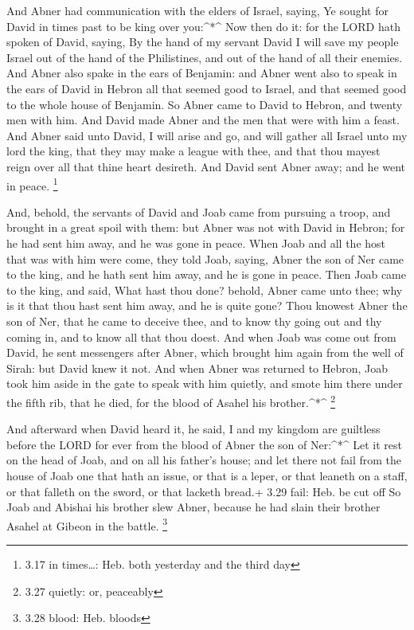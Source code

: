  And Abner had communication with the elders of Israel,
saying, Ye sought for David in times past to be king over you:\^{}*\^{}
 Now then do it: for the LORD hath spoken of David, saying,
By the hand of my servant David I will save my people Israel out of the
hand of the Philistines, and out of the hand of all their enemies.
 And Abner also spake in the ears of Benjamin: and Abner
went also to speak in the ears of David in Hebron all that seemed good
to Israel, and that seemed good to the whole house of Benjamin.
 So Abner came to David to Hebron, and twenty men with him.
And David made Abner and the men that were with him a feast.
 And Abner said unto David, I will arise and go, and will
gather all Israel unto my lord the king, that they may make a league
with thee, and that thou mayest reign over all that thine heart
desireth. And David sent Abner away; and he went in peace. \footnote{3.17
  in times\ldots: Heb. both yesterday and the third day}

 And, behold, the servants of David and Joab came from
pursuing a troop, and brought in a great spoil with them: but Abner was
not with David in Hebron; for he had sent him away, and he was gone in
peace.  When Joab and all the host that was with him were
come, they told Joab, saying, Abner the son of Ner came to the king, and
he hath sent him away, and he is gone in peace.  Then Joab
came to the king, and said, What hast thou done? behold, Abner came unto
thee; why is it that thou hast sent him away, and he is quite gone?
 Thou knowest Abner the son of Ner, that he came to deceive
thee, and to know thy going out and thy coming in, and to know all that
thou doest.  And when Joab was come out from David, he sent
messengers after Abner, which brought him again from the well of Sirah:
but David knew it not.  And when Abner was returned to
Hebron, Joab took him aside in the gate to speak with him quietly, and
smote him there under the fifth rib, that he died, for the blood of
Asahel his brother.\^{}*\^{} \footnote{3.27 quietly: or, peaceably}

 And afterward when David heard it, he said, I and my
kingdom are guiltless before the LORD for ever from the blood of Abner
the son of Ner:\^{}*\^{}  Let it rest on the head of Joab,
and on all his father's house; and let there not fail from the house of
Joab one that hath an issue, or that is a leper, or that leaneth on a
staff, or that falleth on the sword, or that lacketh bread.+ 3.29 fail:
Heb. be cut off  So Joab and Abishai his brother slew
Abner, because he had slain their brother Asahel at Gibeon in the
battle. \footnote{3.28 blood: Heb. bloods}

